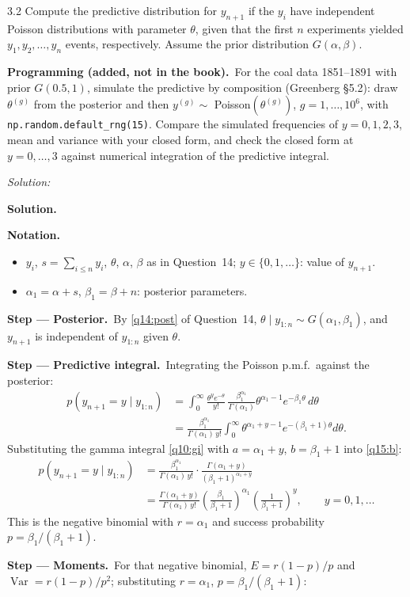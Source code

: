 \documentclass[11pt,a4paper]{article}
\newif\ifsolucoes
\newcommand{\espacoresol}{4.5cm}   %
\numberwithin{equation}{questao}   %
\newcommand{\programacao}{\par\smallskip\noindent\textbf{Programming (added, not in the book).}~}
\newenvironment{notacao}{\par\smallskip\noindent\textbf{Notation.}\begin{itemize}[leftmargin=1.4em,topsep=1pt,itemsep=0pt]\small}{\end{itemize}}
\newcommand{\resolespaco}{\ifsolucoes\else\par\textit{Solution:}\vspace{\espacoresol}\par\fi}
\newcommand{\passo}[2]{\par\smallskip\noindent\textbf{Step --- #1.}~#2}
\newcommand{\solhead}{\par\medskip\noindent{\color{blue!55!black}\rule{\linewidth}{0.3pt}}\par\noindent\textbf{Solution.}}
\newcommand{\1}{\mathbf{1}}
\begin{document}
3.2 Compute the predictive distribution for $y_{n+1}$ if the $y_i$ have independent Poisson
distributions with parameter $\theta$, given that the first $n$ experiments yielded
$y_1,y_2,\ldots,y_n$ events, respectively. Assume the prior distribution $G(\alpha,\beta)$.
\programacao For the coal data 1851--1891 with prior $G(0.5,1)$, simulate the predictive by
composition (Greenberg §5.2): draw $\theta^{(g)}$ from the posterior and then
$y^{(g)}\sim$ Poisson$(\theta^{(g)})$, $g=1,\dots,10^6$, with \texttt{np.random.default\_rng(15)}.
Compare the simulated frequencies of $y=0,1,2,3$, mean and variance with your closed form, and
check the closed form at $y=0,\dots,3$ against numerical integration of the predictive integral.
\resolespaco
\begin{sol}
\solhead
\begin{notacao}
\item $y_i$, $s=\sum_{i\le n}y_i$, $\theta$, $\alpha$, $\beta$ as in Question~14; $y\in\{0,1,\ldots\}$: value of $y_{n+1}$.
\item $\alpha_1=\alpha+s$, $\beta_1=\beta+n$: posterior parameters.
\end{notacao}
\passo{Posterior}{By \eqref{q14:post} of Question~14, $\theta\mid y_{1:n}\sim G(\alpha_1,\beta_1)$, and
$y_{n+1}$ is independent of $y_{1:n}$ given $\theta$.}
\passo{Predictive integral}{Integrating the Poisson p.m.f.\ against the posterior:}
\begin{align}
p(y_{n+1}=y\mid y_{1:n})&=\int_0^\infty\frac{\theta^{y}e^{-\theta}}{y!}\,\frac{\beta_1^{\alpha_1}}{\Gamma(\alpha_1)}\theta^{\alpha_1-1}e^{-\beta_1\theta}\,d\theta\label{q15:a}\\
&=\frac{\beta_1^{\alpha_1}}{\Gamma(\alpha_1)\,y!}\int_0^\infty\theta^{\alpha_1+y-1}e^{-(\beta_1+1)\theta}d\theta.\label{q15:b}
\end{align}
Substituting the gamma integral \eqref{q10:gi} with $a=\alpha_1+y$, $b=\beta_1+1$ into \eqref{q15:b}:
\begin{align}
p(y_{n+1}=y\mid y_{1:n})&=\frac{\beta_1^{\alpha_1}}{\Gamma(\alpha_1)\,y!}\cdot\frac{\Gamma(\alpha_1+y)}{(\beta_1+1)^{\alpha_1+y}}\label{q15:c}\\
&=\frac{\Gamma(\alpha_1+y)}{\Gamma(\alpha_1)\,y!}\left(\frac{\beta_1}{\beta_1+1}\right)^{\alpha_1}\left(\frac{1}{\beta_1+1}\right)^{y},\qquad y=0,1,\ldots\label{q15:nb}
\end{align}
This is the negative binomial with $r=\alpha_1$ and success probability $p=\beta_1/(\beta_1+1)$.
\passo{Moments}{For that negative binomial, $E=r(1-p)/p$ and $\operatorname{Var}=r(1-p)/p^2$; substituting $r=\alpha_1$, $p=\beta_1/(\beta_1+1)$:}

\end{sol}
\end{document}

